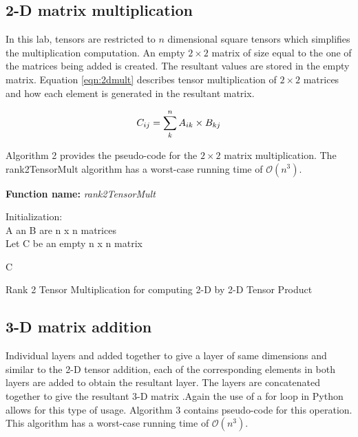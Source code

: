 \documentclass[10pt,journal]{article}
\begin{document}
\subsection{2-D matrix multiplication}
In this lab, tensors are restricted to $n$ dimensional square tensors which simplifies the multiplication computation. An empty  $2\times 2$ matrix of size equal to the one of the matrices being added is created. The resultant values are stored in the empty matrix. Equation \ref{eqn:2dmult} describes tensor multiplication of  $2\times 2$ matrices and how each element is generated in the resultant matrix.

\begin{equation}
    \Large{C_{ij}=\sum_k^n{A_{ik}\times B_{kj}}}
    \label{eqn:2dmult}
\end{equation}

Algorithm 2 provides the pseudo-code for the $2\times 2$ matrix multiplication.
The rank2TensorMult algorithm has a worst-case running time of $\mathcal{O}(n^3)$.
\newline 
\begin{algorithm}[H]
\SetAlgoLined
\textbf{Function name:} \emph{rank2TensorMult}

 Initialization\::\\ 
  A an B are n x n matrices\\
  Let C be an empty n x n matrix
 
  {
    }
 
 \Return C
 
\caption{Rank 2 Tensor Multiplication for computing 2-D by 2-D Tensor Product}
\end{algorithm}

\subsection{3-D matrix addition}

Individual layers and added together to give a layer of same dimensions and similar to the 2-D tensor addition, each of the corresponding elements in both layers are added to obtain the resultant layer. The layers are concatenated together to give the resultant 3-D matrix  .Again the use of a for loop in Python allows for this type of usage. Algorithm 3 contains pseudo-code for this operation. This algorithm has a worst-case running time of $\mathcal{O}(n^3)$.
\end{document}
